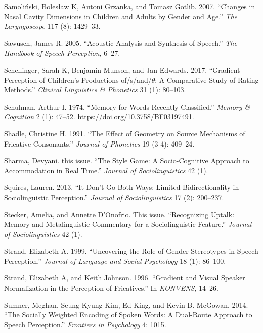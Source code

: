 \documentclass[
  letterpaper,
  DIV=11,
  numbers=noendperiod]{scrartcl}
\newlength{\cslhangindent}
\newenvironment{CSLReferences}[2] %
 {\begin{list}{}{%
  \setlength{\itemindent}{0pt}
  \setlength{\leftmargin}{0pt}
  \setlength{\parsep}{0pt}
  \ifodd #1
   \setlength{\leftmargin}{\cslhangindent}
   \setlength{\itemindent}{-1\cslhangindent}
  \fi
  \setlength{\itemsep}{#2\baselineskip}}}
 {\end{list}}
\begin{document}
\begin{CSLReferences}{1}{0}
Samoliński, Bolesław K, Antoni Grzanka, and Tomasz Gotlib. 2007.
{``Changes in Nasal Cavity Dimensions in Children and Adults by Gender
and Age.''} \emph{The Laryngoscope} 117 (8): 1429--33.

Sawusch, James R. 2005. {``Acoustic Analysis and Synthesis of Speech.''}
\emph{The Handbook of Speech Perception}, 6--27.

Schellinger, Sarah K, Benjamin Munson, and Jan Edwards. 2017.
{``Gradient Perception of Children's Productions of/s/and/\(\theta\): A
Comparative Study of Rating Methods.''} \emph{Clinical Linguistics \&
Phonetics} 31 (1): 80--103.

Schulman, Arthur I. 1974. {``Memory for Words Recently Classified.''}
\emph{Memory \& Cognition} 2 (1): 47--52.
\url{https://doi.org/10.3758/BF03197491}.

Shadle, Christine H. 1991. {``The Effect of Geometry on Source
Mechanisms of Fricative Consonants.''} \emph{Journal of Phonetics} 19
(3-4): 409--24.

Sharma, Devyani. this issue. {``The Style Game: A Socio-Cognitive
Approach to Accommodation in Real Time.''} \emph{Journal of
Sociolinguistics} 42 (1).

Squires, Lauren. 2013. {``It Don't Go Both Ways: Limited
Bidirectionality in Sociolinguistic Perception.''} \emph{Journal of
Sociolinguistics} 17 (2): 200--237.

Stecker, Amelia, and Annette D'Onofrio. This issue. {``Recognizing
Uptalk: Memory and Metalinguistic Commentary for a Sociolinguistic
Feature.''} \emph{Journal of Sociolinguistics} 42 (1).

Strand, Elizabeth A. 1999. {``Uncovering the Role of Gender Stereotypes
in Speech Perception.''} \emph{Journal of Language and Social
Psychology} 18 (1): 86--100.

Strand, Elizabeth A, and Keith Johnson. 1996. {``Gradient and Visual
Speaker Normalization in the Perception of Fricatives.''} In
\emph{KONVENS}, 14--26.

Sumner, Meghan, Seung Kyung Kim, Ed King, and Kevin B. McGowan. 2014.
{``The Socially Weighted Encoding of Spoken Words: A Dual-Route Approach
to Speech Perception.''} \emph{Frontiers in Psychology} 4: 1015.


\end{CSLReferences}
\end{document}
